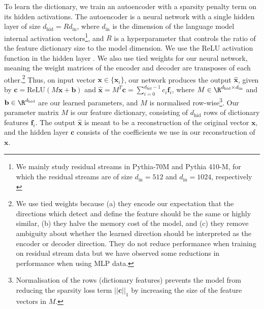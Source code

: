 To learn the dictionary, we train an autoencoder with a sparsity penalty term on its hidden activations. The autoencoder is a neural network with a single hidden layer of size $d_{\text{hid}}=R d_{\text{in}}$, where $d_{\text{in}}$ is the dimension of the language model internal activation vectors\footnote{We mainly study residual streams in Pythia-70M and Pythia 410-M, for which the residual streams are of size $d_{\text{in}}=512$ and $d_{\text{in}}=1024$, respectively \citep{biderman2023pythia}}, and $R$ is a hyperparameter that controls the ratio of the feature dictionary size to the model dimension. We use the ReLU activation function in the hidden layer \citep{fukushima1975relu}. We also use tied weights for our neural network, meaning the weight matrices of the encoder and decoder are transposes of each other.\footnote{We use tied weights because (a) they encode our expectation that the directions which detect and define the feature should be the same or highly similar, (b) they halve the memory cost of the model, and 
(c) they remove ambiguity about whether the learned direction should be interpreted as the encoder or decoder direction. They do not reduce performance when training on residual stream data but we have observed some reductions in performance when using MLP data.}  Thus, on input vector $\mathbf{x} \in \{\mathbf{x}_i\}$, our network produces the output $\mathbf{\hat x}$, given by $\mathbf{c} = \mathrm{ReLU}(M\mathbf{x}+\mathbf{b})$ and $\mathbf{\hat x} = M^T \mathbf{c} \label{eq:decoder} =\displaystyle  \sum_{i = 0}^{d_{\text{hid}}-1} c_i \mathbf{f}_i$, where $M \in \R^{d_{\text{hid}} \times d_{\text{in}}}$ and $\mathbf{b} \in \R^{d_{\text{hid}}}$ are our learned parameters, and $M$ is normalised row-wise\footnote{Normalisation of the rows (dictionary features) prevents the model from reducing the sparsity loss term $||\mathbf{c}||_1$ by increasing the size of the feature vectors in $M$.}. Our parameter matrix $M$ is our feature dictionary, consisting of $d_{\text{hid}}$ rows of dictionary features $\mathbf{f}_i$. The output $\mathbf{\hat x}$ is meant to be a reconstruction of the original vector $\mathbf x$, and the hidden layer $\mathbf c$ consists of the coefficients we use in our reconstruction of $\mathbf x$. 





